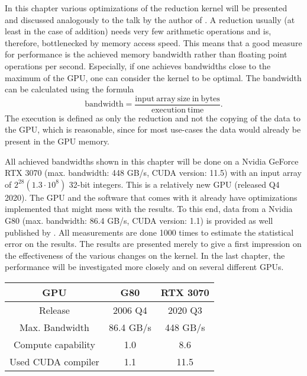 In this chapter various optimizations of the reduction kernel will be presented and discussed analogously to the talk by the author of \cite{Harris}.
A reduction usually (at least in the case of addition) needs very few arithmetic operations and is, therefore, bottlenecked by memory access speed.
This means that a good measure for performance is the achieved memory bandwidth rather than floating point operations per second.
Especially, if one achieves bandwidths close to the maximum of the GPU, one can consider the kernel to be optimal.
The bandwidth can be calculated using the formula
\begin{equation}
    \mathrm{bandwidth} = \frac{\mathrm{input\ array\ size\ in\ bytes}}{\mathrm{execution\ time}}.
\end{equation}
The execution is defined as only the reduction and not the copying of the data to the GPU, which is reasonable, since for most use-cases the data would already be present in the GPU memory.

All achieved bandwidths shown in this chapter will be done on a Nvidia GeForce RTX 3070 (max. bandwidth: 448 GB/s, CUDA version: 11.5) with an input array of \( 2^{28} (1.3\cdot 10^8)\) 32-bit integers. 
This is a relatively new GPU (released Q4 2020).
The GPU and the software that comes with it already have optimizations implemented that might mess with the results.
To this end, data from a Nvidia G80 (max. bandwidth: 86.4 GB/s, CUDA version: 1.1) is provided as well published by \cite{Harris}.
All measurements are done 1000 times to estimate the statistical error on the results.
The results are presented merely to give a first impression on the effectiveness of the various changes on the kernel.
In the last chapter, the performance will be investigated more closely and on several different GPUs.

\begin{center}
    \begin{tabular}{|c|c|c|}
        \hline
        GPU & G80 & RTX 3070 \\
        \hline
        Release & 2006 Q4 & 2020 Q3 \\ 
        \hline
        Max. Bandwidth & 86.4 GB/s & 448 GB/s \\
        \hline
        Compute capability & 1.0 & 8.6 \\
        \hline
        Used CUDA compiler & 1.1 & 11.5 \\
        \hline
    \end{tabular}
\end{center}

